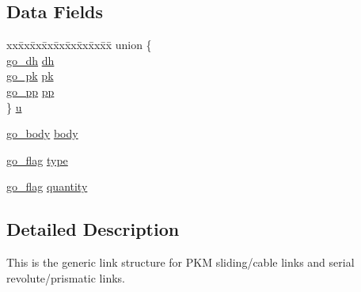 \subsection*{Data Fields}
\begin{DoxyCompactItemize}
\item 
\begin{tabbing}
xx\=xx\=xx\=xx\=xx\=xx\=xx\=xx\=xx\=\kill
union \{\\
\>\hyperlink{structgomotion_1_1go__dh}{go\_dh} \hyperlink{structgomotion_1_1go__link_acb0559852ab118cc11f102bb11ff9811}{dh}\\
\>\hyperlink{structgomotion_1_1go__pk}{go\_pk} \hyperlink{structgomotion_1_1go__link_a681e1395c9921b192466d8a27c348d4d}{pk}\\
\>\hyperlink{structgomotion_1_1go__pp}{go\_pp} \hyperlink{structgomotion_1_1go__link_aeb6fd1a42fc5194080ffa0f89dae8e20}{pp}\\
\} \hyperlink{structgomotion_1_1go__link_aacb42b16b578a2fbf1b7c25b18cafe2b}{u}\\

\end{tabbing}\item 
\hyperlink{structgomotion_1_1go__body}{go\-\_\-body} \hyperlink{structgomotion_1_1go__link_a27aa5b81fdb2402883899a11375891c3}{body}
\item 
\hyperlink{gotypes_8h_ae890d9a0ddecc0d3073622cc4312092d}{go\-\_\-flag} \hyperlink{structgomotion_1_1go__link_ad159e1d034c86635efc11a6b0c34dc7e}{type}
\item 
\hyperlink{gotypes_8h_ae890d9a0ddecc0d3073622cc4312092d}{go\-\_\-flag} \hyperlink{structgomotion_1_1go__link_aa70635d6c7483d989c6cd8c0616145a5}{quantity}
\end{DoxyCompactItemize}


\subsection{Detailed Description}
This is the generic link structure for P\-K\-M sliding/cable links and serial revolute/prismatic links. 

